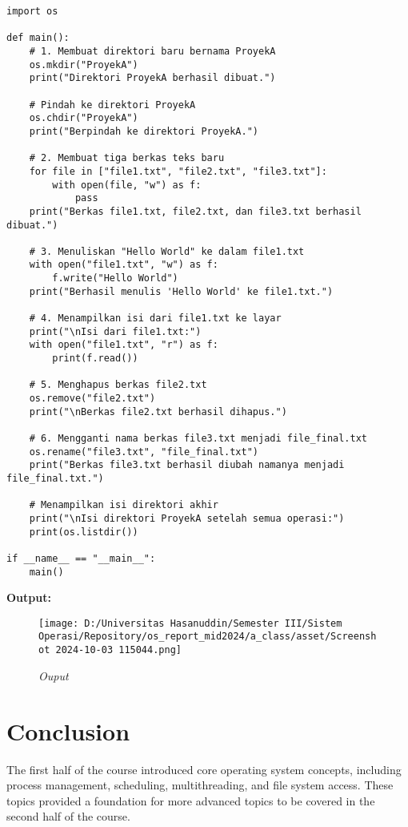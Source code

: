 \documentclass[12pt]{article}
\begin{document}
\begin{lstlisting}
import os

def main():
    # 1. Membuat direktori baru bernama ProyekA
    os.mkdir("ProyekA")
    print("Direktori ProyekA berhasil dibuat.")
    
    # Pindah ke direktori ProyekA
    os.chdir("ProyekA")
    print("Berpindah ke direktori ProyekA.")

    # 2. Membuat tiga berkas teks baru
    for file in ["file1.txt", "file2.txt", "file3.txt"]:
        with open(file, "w") as f:
            pass
    print("Berkas file1.txt, file2.txt, dan file3.txt berhasil dibuat.")
    
    # 3. Menuliskan "Hello World" ke dalam file1.txt
    with open("file1.txt", "w") as f:
        f.write("Hello World")
    print("Berhasil menulis 'Hello World' ke file1.txt.")
    
    # 4. Menampilkan isi dari file1.txt ke layar
    print("\nIsi dari file1.txt:")
    with open("file1.txt", "r") as f:
        print(f.read())
    
    # 5. Menghapus berkas file2.txt
    os.remove("file2.txt")
    print("\nBerkas file2.txt berhasil dihapus.")
    
    # 6. Mengganti nama berkas file3.txt menjadi file_final.txt
    os.rename("file3.txt", "file_final.txt")
    print("Berkas file3.txt berhasil diubah namanya menjadi file_final.txt.")
    
    # Menampilkan isi direktori akhir
    print("\nIsi direktori ProyekA setelah semua operasi:")
    print(os.listdir())
    
if __name__ == "__main__":
    main()
\end{lstlisting}

\newpage
\textbf{Output:}
\begin{figure}[h]
    \centering
    \texttt{[image: D:/Universitas Hasanuddin/Semester III/Sistem Operasi/Repository/os\_report\_mid2024/a\_class/asset/Screenshot 2024-10-03 115044.png]}
    \caption{\textit{Ouput}}
    
\end{figure}

\section{Conclusion}
The first half of the course introduced core operating system concepts, including process management, scheduling, multithreading, and file system access. These topics provided a foundation for more advanced topics to be covered in the second half of the course.
\end{document}
